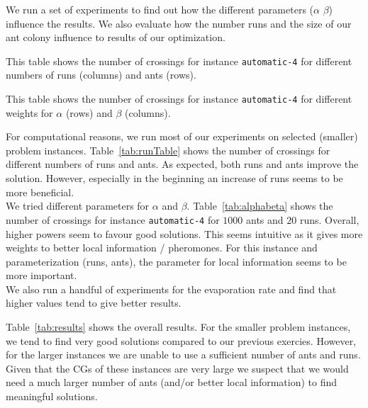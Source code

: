 \documentclass{scrartcl}
\begin{document}
We run a set of experiments to find out how the different parameters
($\alpha$ $\beta$) influence the results. We also evaluate how the
number runs and the size of our ant colony influence to results of our
optimization. \\


\begin{table}[!H]
\centering
\scriptsize  

\caption{This table shows the number of crossings for instance \texttt{automatic-4} for
different numbers of runs (columns) and ants (rows).}
\label{tab:runTable}
\end{table}


\begin{table}[!H]
\centering
\scriptsize  

\caption{This table shows the number of crossings for instance \texttt{automatic-4} for
different weights for $\alpha$ (rows) and $\beta$ (columns).}
\label{tab:alphabeta}
\end{table}


For computational reasons, we run most of our experiments on selected
(smaller) problem instances. Table~\ref{tab:runTable} shows the number
of crossings for different numbers of runs and ants. As expected, both
runs and ants improve the solution. However, especially in the
beginning an increase of runs seems to be more beneficial.\\

We tried different parameters for $\alpha$ and
$\beta$. Table~\ref{tab:alphabeta} shows the number of crossings for
instance \texttt{automatic-4} for $1000$ ants and $20$ runs.  Overall,
higher powers seem to favour good solutions. This seems intuitive as
it gives more weights to better local information / pheromones. For
this instance and parameterization (runs, ants), the parameter for
local information seems to be more important. \\

We also run a handful of experiments for the evaporation rate and find that
higher values tend to give better results.

Table~\ref{tab:results} shows the overall results. For the smaller
problem instances, we tend to find very good solutions compared to our
previous exercies. However, for the larger instances we are unable to
use a sufficient number of ants and runs. Given that the CGs of these
instances are very large we suspect that we would need a much larger
number of ants (and/or better local information) to find meaningful
solutions.
\end{document}
